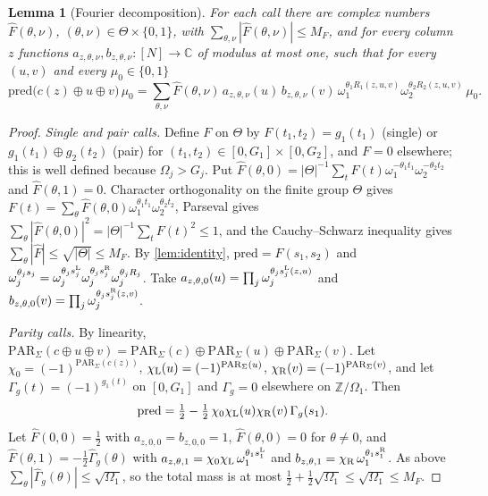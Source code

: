 \documentclass[11pt,letterpaper]{article}
\newtheorem{lemma}[theorem]{Lemma}
\theoremstyle{definition}
\theoremstyle{remark}
\newcommand{\Z}{\mathbb Z}
\newcommand{\C}{\mathbb C}
\newcommand{\PAR}{\mathrm{PAR}}
\newcommand{\pred}{\mathrm{pred}}
\begin{document}
\begin{lemma}[Fourier decomposition]\label{lem:fourier}
For each call there are complex numbers \(\widehat F(\theta,\nu)\),
\((\theta,\nu)\in\Theta\times\{0,1\}\), with
\(\sum_{\theta,\nu}|\widehat F(\theta,\nu)|\le M_F\), and for every
column \(z\) functions
\(a_{z,\theta,\nu},b_{z,\theta,\nu}:[N]\to\C\) of modulus at
most one, such that for every \((u,v)\) and every
\(\mu_0\in\{0,1\}\)
\[
 \pred\bigl(c(z)\oplus u\oplus v\bigr)\,\mu_0
 =\sum_{\theta,\nu}\widehat F(\theta,\nu)\,a_{z,\theta,\nu}(u)\,b_{z,\theta,\nu}(v)\,
 \omega_1^{\theta_1R_1(z,u,v)}\omega_2^{\theta_2R_2(z,u,v)}\,\mu_0 .
\]
\end{lemma}
\begin{proof}
\emph{Single and pair calls.} Define \(F\) on \(\Theta\) by
\(F(t_1,t_2)=g_1(t_1)\) (single) or \(g_1(t_1)\oplus g_2(t_2)\) (pair)
for \((t_1,t_2)\in[0,G_1]\times[0,G_2]\), and \(F=0\) elsewhere; this
is well defined because \(\Omega_j>G_j\). Put
\(\widehat F(\theta,0)=|\Theta|^{-1}\sum_tF(t)\omega_1^{-\theta_1t_1}\omega_2^{-\theta_2t_2}\)
and \(\widehat F(\theta,1)=0\). Character orthogonality on the finite
group \(\Theta\) gives
\(F(t)=\sum_\theta\widehat F(\theta,0)\omega_1^{\theta_1t_1}\omega_2^{\theta_2t_2}\),
Parseval gives
\(\sum_\theta|\widehat F(\theta,0)|^2=|\Theta|^{-1}\sum_tF(t)^2\le1\),
and the Cauchy--Schwarz inequality gives \(\sum_\theta|\widehat F|\le\sqrt{|\Theta|}\le M_F\).
By \cref{lem:identity}, \(\pred=F(s_1,s_2)\) and
\(\omega_j^{\theta_js_j}=\omega_j^{\theta_js^{\rm L}_j}\omega_j^{\theta_js^{\rm R}_j}\omega_j^{\theta_jR_j}\).
Take \(a_{z,\theta,0}(u)=\prod_j\omega_j^{\theta_js^{\rm L}_j(z,u)}\)
and \(b_{z,\theta,0}(v)=\prod_j\omega_j^{\theta_js^{\rm R}_j(z,v)}\).

\emph{Parity calls.} By linearity,
\(\PAR_\Sigma(c\oplus u\oplus v)=\PAR_\Sigma(c)\oplus\PAR_\Sigma(u)\oplus\PAR_\Sigma(v)\).
Let \(\chi_0=(-1)^{\PAR_\Sigma(c(z))}\), \(\chi_{\rm L}(u)=(-1)^{\PAR_\Sigma(u)}\),
\(\chi_{\rm R}(v)=(-1)^{\PAR_\Sigma(v)}\), and let
\(\Gamma_g(t)=(-1)^{g_1(t)}\) on \([0,G_1]\) and \(\Gamma_g=0\)
elsewhere on \(\Z/\Omega_1\). Then
\[
 \pred=\tfrac12-\tfrac12\,\chi_0\chi_{\rm L}(u)\chi_{\rm R}(v)\,\Gamma_g(s_1).
\]
Let \(\widehat F(0,0)=\tfrac12\) with \(a_{z,0,0}=b_{z,0,0}=1\),
\(\widehat F(\theta,0)=0\) for \(\theta\ne0\), and
\(\widehat F(\theta,1)=-\tfrac12\widehat\Gamma_g(\theta)\) with
\(a_{z,\theta,1}=\chi_0\chi_{\rm L}\,\omega_1^{\theta_1s^{\rm L}_1}\) and
\(b_{z,\theta,1}=\chi_{\rm R}\,\omega_1^{\theta_1s^{\rm R}_1}\). As above
\(\sum_\theta|\widehat\Gamma_g(\theta)|\le\sqrt{\Omega_1}\), so the total
mass is at most \(\tfrac12+\tfrac12\sqrt{\Omega_1}\le\sqrt{\Omega_1}\le M_F\).
\end{proof}
\end{document}
